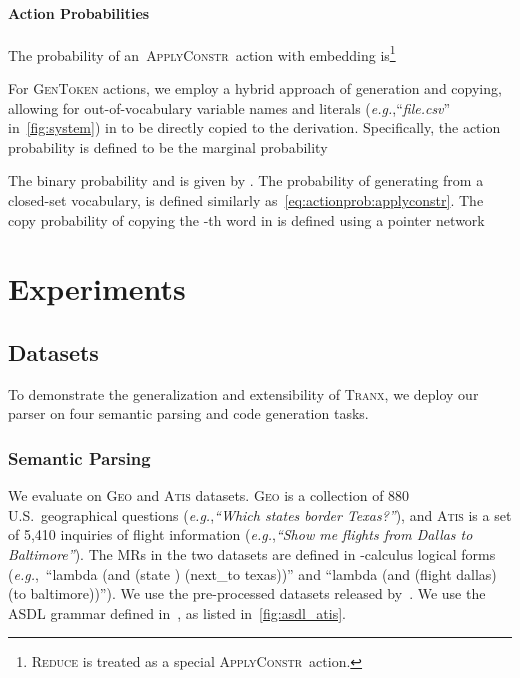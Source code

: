 \documentclass[11pt,a4paper]{article}
\renewcommand{\tt}[1]{\fontfamily{cmtt}\selectfont #1}
\newcommand\applyconstrn{\textsc{ApplyConstr}}
\newcommand{\eg}{{\emph{e.g.}},\xspace}
\def\model/{\textsc{Tranx}}
\def\atis/{\textsc{Atis}}
\def\geo/{\textsc{Geo}}
\begin{document}
\paragraph{Action Probabilities} 
The probability of an~\applyconstrn~action with embedding  is\footnote{\textsc{Reduce} is treated as a special \applyconstrn\ action.}
\begingroup
\setlength\abovedisplayskip{5pt}
\setlength\belowdisplayskip{5pt}

\endgroup
For \textsc{GenToken} actions, we employ a hybrid approach of generation and copying, allowing for out-of-vocabulary variable names and literals (\eg ``\textit{file.csv}'' in~\autoref{fig:system}) in  to be directly copied to the derivation. Specifically, the action probability is defined to be the marginal probability
\begingroup
\setlength\abovedisplayskip{5pt}
\setlength\belowdisplayskip{5pt}

\endgroup
The binary probability  and  is given by .
The probability of generating  from a closed-set vocabulary,  is defined similarly as~\cref{eq:actionprob:applyconstr}.
The copy probability of copying the -th word in  is defined using a pointer network~\citep{DBLP:conf/nips/VinyalsFJ15}


\section{Experiments}
\label{sec:exp}

\vspace{-1mm}
\subsection{Datasets}
\vspace{-1mm}
To demonstrate the generalization and extensibility of \model/, we deploy our parser on four semantic parsing and code generation tasks.

\vspace{-1mm}
\subsubsection{Semantic Parsing}
\vspace{-1mm}

We evaluate on \geo/ and \atis/ datasets.
\geo/ is a collection of 880 U.S.~geographical questions (\eg \textit{``Which states border Texas?''}), and \atis/ is a set of 5,410 inquiries of flight information (\eg \textit{``Show me flights from Dallas to Baltimore''}). The MRs in the two datasets are defined in -calculus logical forms (\eg~``{\tt lambda  (and (state ) (next\_to  texas))}'' and ``{\tt lambda  (and (flight  dallas) (to  baltimore))}'').
We use the pre-processed datasets released by~\citet{DBLP:conf/acl/DongL16}.
We use the ASDL grammar defined in~\citet{rabinovich17syntaxnet}, as listed in~\autoref{fig:asdl_atis}.
\end{document}
